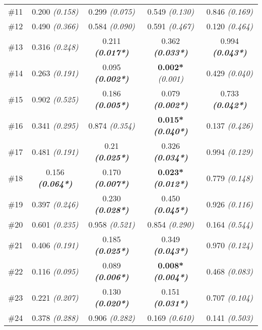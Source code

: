 \documentclass[twoside]{bhamthesis}
\theoremstyle{definition}
\begin{document}
\begin{table}[!ht]
\begin{center}
\begin{tabular}{|c| c c c c|}
\rule[-1ex]{0pt}{3.5ex}  \#11 & 0.200 \textit{(0.158)} & 0.299 \textit{(0.075)}  & 0.549 \textit{(0.130)}  & 0.846 \textit{(0.169)} \\
\rule[-1ex]{0pt}{3.5ex}  \#12  & 0.490 \textit{(0.366)} & 0.584 \textit{(0.090)}  & 0.591 \textit{(0.467)} & 0.120 \textit{(0.464)} \\
\rule[-1ex]{0pt}{3.5ex}  \#13  & 0.316 \textit{(0.248)} & 0.211 \textbf{\textit{(0.017*)}} & 0.362 \textbf{\textit{(0.033*)}} & 0.994 \textbf{\textit{(0.043*)}}  \\
\rule[-1ex]{0pt}{3.5ex}  \#14  & 0.263 \textit{(0.191)} & 0.095 \textbf{\textit{(0.002*)}} & \textbf{0.002*} \textit{(0.001)} & 0.429 \textit{(0.040)}  \\ 
\rule[-1ex]{0pt}{3.5ex}  \#15  & 0.902 \textit{(0.525)} & 0.186 \textbf{\textit{(0.005*)}}  & 0.079 \textbf{\textit{(0.002*)} } & 0.733 \textbf{\textit{(0.042*)}}\\
\rule[-1ex]{0pt}{3.5ex}  \#16  & 0.341 \textit{(0.295)} & 0.874 \textit{(0.354)} & \textbf{0.015*} \textbf{\textit{(0.040*)}} & 0.137 \textit{(0.426)} \\
\rule[-1ex]{0pt}{3.5ex}  \#17 & 0.481 \textit{(0.191)} & 0.21 \textbf{\textit{(0.025*)}} & 0.326\textbf{ \textit{(0.034*)}}  & 0.994 \textit{(0.129)} \\
\rule[-1ex]{0pt}{3.5ex}  \#18  & 0.156  \textbf{\textit{(0.064*)}}& 0.170 \textbf{\textit{(0.007*)}} & \textbf{0.023*} \textbf{\textit{(0.012*)}} & 0.779 \textit{(0.148)} \\ 
\rule[-1ex]{0pt}{3.5ex}  \#19 & 0.397 \textit{(0.246)} & 0.230 \textbf{\textit{(0.028*)}} & 0.450 \textbf{\textit{(0.045*)}} & 0.926 \textit{(0.116)}   \\
\rule[-1ex]{0pt}{3.5ex}  \#20 & 0.601 \textit{(0.235)} & 0.958 \textit{(0.521)} & 0.854 \textit{(0.290)} & 0.164 \textit{(0.544)}  \\
\rule[-1ex]{0pt}{3.5ex}  \#21  & 0.406 \textit{(0.191)} & 0.185 \textbf{\textit{(0.025*)} } & 0.349 \textbf{\textit{(0.043*)}} & 0.970 \textit{(0.124)} \\
\rule[-1ex]{0pt}{3.5ex}  \#22  & 0.116 \textit{(0.095)} & 0.089 \textbf{\textit{(0.006*)}} & \textbf{0.008*} \textbf{\textit{(0.004*)}} & 0.468 \textit{(0.083)}  \\ 
\rule[-1ex]{0pt}{3.5ex}  \#23  & 0.221 \textit{(0.207)} & 0.130 \textbf{\textit{(0.020*)}} & 0.151 \textbf{\textit{(0.031*)}} & 0.707 \textit{(0.104)}  \\
\rule[-1ex]{0pt}{3.5ex}  \#24  & 0.378 \textit{(0.288)} & 0.906 \textit{(0.282)} & 0.169 \textit{(0.610)}& 0.141 \textit{(0.503)} \\

\end{tabular}
\end{center}
\end{table}
\end{document}
